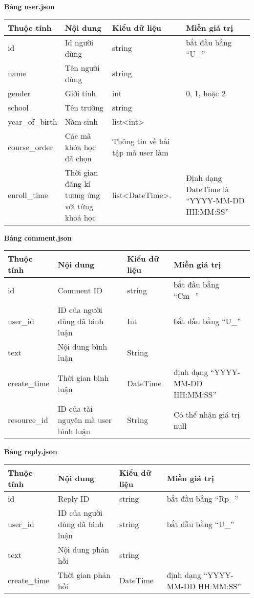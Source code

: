 \newpage
%
\textbf{Bảng user.json}
\begin{center}
\begin{tabular}{|| m{7em}  m{10em}  m{11em}  m{5em}||} 
 \hline
 Thuộc tính & Nội dung & Kiểu dữ liệu & Miền giá trị \\ [0.5ex] 
 \hline\hline
id &Id người dùng & string & bắt đầu bằng “U\_” \\
 \hline
 name &Tên người dùng & string &  \\ \hline
 gender & Giới tính &int &0, 1, hoặc 2\\
 \hline
 school &Tên trường & string &  \\ \hline
 year\_of\_birth &Năm sinh & list<int>&  \\ \hline
 course\_order &Các mã khóa học đã chọn & Thông tin về bài tập mà user làm & \\ \hline
 enroll\_time & Thời gian đăng kí tương ứng với từng khoá học  & list<DateTime>.  &Định dạng DateTime là “YYYY-MM-DD HH:MM:SS” \\ [1ex] 
 \hline
\end{tabular}
\end{center}
%
\textbf{Bảng comment.json}
\begin{center}
\begin{tabular}{|| m{7em}  m{10em}  m{11em}  m{5em}||} 
 \hline
 Thuộc tính & Nội dung & Kiểu dữ liệu & Miền giá trị \\ [0.5ex] 
 \hline\hline
id & Comment ID & string & bắt đầu bằng “Cm\_” \\
 \hline
 user\_id &ID của người dùng đã bình luận & Int & bắt đầu bằng “U\_” \\ \hline
 text & Nội dung bình luận &String &\\
 \hline
 create\_time &Thời gian bình luận & DateTime & định dạng “YYYY-MM-DD HH:MM:SS” \\ \hline
 resource\_id & ID của tài nguyên mà user bình luận  &String & Có thể nhận giá trị null\\ [1ex] 
 \hline
\end{tabular}
\end{center}
%
%
\textbf{Bảng reply.json}
\begin{center}
\begin{tabular}{|| m{7em}  m{10em}  m{11em}  m{5em}||} 
 \hline
 Thuộc tính & Nội dung & Kiểu dữ liệu & Miền giá trị \\ [0.5ex] 
 \hline\hline
id & Reply ID & string & bắt đầu bằng “Rp\_” \\
 \hline
 user\_id &ID của người dùng đã bình luận & string & bắt đầu bằng “U\_” \\ \hline
 text & Nội dung phản hồi &string &\\
 \hline
 create\_time & Thời gian phản hồi  &DateTime &định dạng “YYYY-MM-DD HH:MM:SS”\\ [1ex] 
 \hline
\end{tabular}
\end{center}
